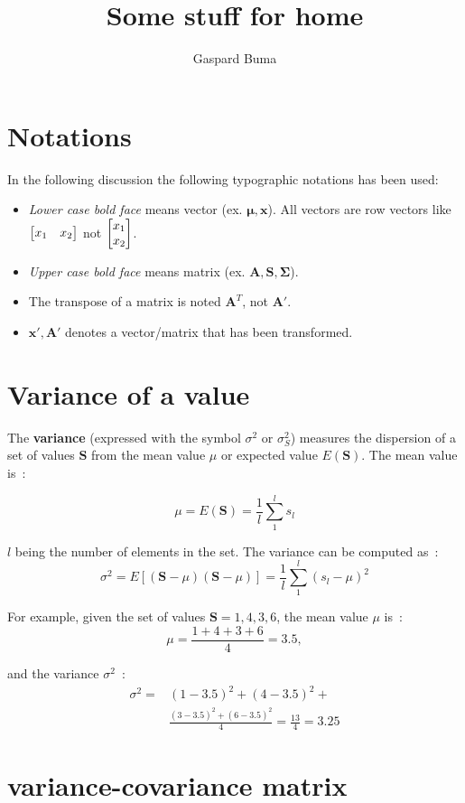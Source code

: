 \documentclass[11pt,twocolumn]{amsart} %
\title{Some stuff for \textbf{home}}
\author{Gaspard Buma}
\newcommand{\ve}[1]{\boldsymbol{#1}}
\newcommand{\ma}[1]{\boldsymbol{#1}}
\newenvironment{m}{\begin{bmatrix}}{\end{bmatrix}}
\begin{document}
\twocolumn[
\maketitle
]
\section{Notations}
In the following discussion the following typographic notations has been used:
\begin{itemize}
  \item \emph{Lower case bold face} means vector (ex. $\ve\mu, \ve{x}$). All vectors are row vectors like $\begin{m} x_1 & x_2 \end{m}$ not $\begin{m} x_1 \\ x_2 \end{m}$.
  \item \emph{Upper case bold face} means matrix (ex. $\ma{A}, \ma{S}, \ma{\Sigma}$).
  \item The transpose of a matrix is noted $\ma{A}^T$, not $\ma{A}'$.
  \item $\ve{x}', \ma{A}'$ denotes a vector/matrix that has been transformed.
\end{itemize}
\section{Variance of a value}

The \textbf{variance} (expressed with the symbol $\sigma^2$ or $\sigma_S^2$) measures the dispersion of a set of values $\ma{S}$ from the mean value $\mu$ or expected value $E(\ma{S})$. The mean value is~:

\[
  \mu = E(\ma{S}) = \frac{1}{l} \sum_1^{l} s_l
\]

$l$ being the number of elements in the set. The variance can be computed as~:
\[
  \sigma^2 = E[(\ma{S} - \mu)(\ma{S} - \mu)] = \frac{1}{l} \sum_1^{l} (s_l - \mu)^2
\]

For example, given the set of values $\ma{S} = {1,4,3,6}$, the mean value $\mu$ is~:
\[
  \mu = \frac{1+4+3+6}{4} = 3.5,
\]

and the variance $\sigma^2$~:
\begin{align*}
  \sigma^2 = & (1-3.5)^2 + (4-3.5)^2 +\\
             & \frac{(3-3.5)^2 + (6-3.5)^2}{4} = \frac{13}{4} = 3.25
\end{align*}

\section{variance-covariance matrix}
\end{document}
